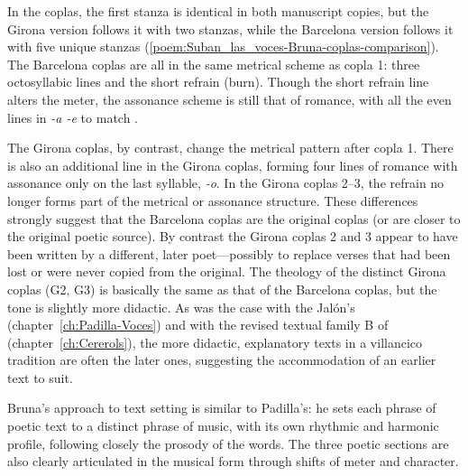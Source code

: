 In the coplas, the first stanza is identical in both manuscript copies, but the Girona version follows it with two stanzas, while the Barcelona version follows it with five unique stanzas (\cref{poem:Suban_las_voces-Bruna-coplas-comparison}).
The Barcelona coplas are all in the same metrical scheme as copla 1: three octosyllabic lines and the short refrain  (burn).
Though the short refrain line alters the meter, the assonance scheme is still that of romance, with all the even lines in \emph{-a -e} to match .

The Girona coplas, by contrast, change the metrical pattern after copla 1.
There is also an additional line in the Girona coplas, forming four lines of romance with assonance only on the last syllable, \emph{-o}.
In the Girona coplas 2--3, the  refrain no longer forms part of the metrical or assonance structure.
These differences strongly suggest that the Barcelona coplas are the original coplas (or are closer to the original poetic source).
By contrast the Girona coplas 2 and 3 appear to have been written by a different, later poet---possibly to replace verses that had been lost or were never copied from the original.
The theology of the distinct Girona coplas (G2, G3) is basically the same as that of the Barcelona coplas, but the tone is slightly more didactic.
As was the case with the Jalón's  (chapter~\ref{ch:Padilla-Voces}) and with the revised textual family B of  (chapter~\ref{ch:Cererols}), the more didactic, explanatory texts in a villancico tradition are often the later ones, suggesting the accommodation of an earlier text to suit.

% 	

Bruna's approach to text setting is similar to Padilla's: he sets each phrase of poetic text to a distinct phrase of music, with its own rhythmic and harmonic profile, following closely the prosody of the words.
The three poetic sections are also clearly articulated in the musical form through shifts of meter and character.

